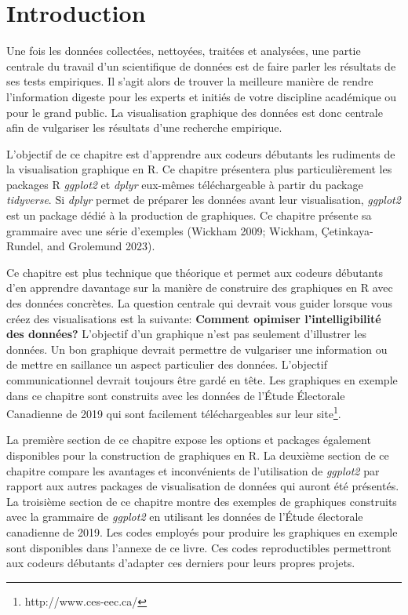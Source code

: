 \documentclass[
  letterpaper,
]{scrbook}
\begin{document}
\hypertarget{introduction-1}{%
\section{Introduction}\label{introduction-1}}

Une fois les données collectées, nettoyées, traitées et analysées, une
partie centrale du travail d'un scientifique de données est de faire
parler les résultats de ses tests empiriques. Il s'agit alors de trouver
la meilleure manière de rendre l'information digeste pour les experts et
initiés de votre discipline académique ou pour le grand public. La
visualisation graphique des données est donc centrale afin de vulgariser
les résultats d'une recherche empirique.

L'objectif de ce chapitre est d'apprendre aux codeurs débutants les
rudiments de la visualisation graphique en R. Ce chapitre présentera
plus particulièrement les packages R \emph{ggplot2} et \emph{dplyr}
eux-mêmes téléchargeable à partir du package \emph{tidyverse}. Si
\emph{dplyr} permet de préparer les données avant leur visualisation,
\emph{ggplot2} est un package dédié à la production de graphiques. Ce
chapitre présente sa grammaire avec une série d'exemples (Wickham 2009;
Wickham, Çetinkaya-Rundel, and Grolemund 2023).

Ce chapitre est plus technique que théorique et permet aux codeurs
débutants d'en apprendre davantage sur la manière de construire des
graphiques en R avec des données concrètes. La question centrale qui
devrait vous guider lorsque vous créez des visualisations est la
suivante: \textbf{Comment opimiser l'intelligibilité des données?}
L'objectif d'un graphique n'est pas seulement d'illustrer les données.
Un bon graphique devrait permettre de vulgariser une information ou de
mettre en saillance un aspect particulier des données. L'objectif
communicationnel devrait toujours être gardé en tête. Les graphiques en
exemple dans ce chapitre sont construits avec les données de l'Étude
Électorale Canadienne de 2019 qui sont facilement téléchargeables sur
leur site\footnote{http://www.ces-eec.ca/}.

La première section de ce chapitre expose les options et packages
également disponibles pour la construction de graphiques en R. La
deuxième section de ce chapitre compare les avantages et inconvénients
de l'utilisation de \emph{ggplot2} par rapport aux autres packages de
visualisation de données qui auront été présentés. La troisième section
de ce chapitre montre des exemples de graphiques construits avec la
grammaire de \emph{ggplot2} en utilisant les données de l'Étude
électorale canadienne de 2019. Les codes employés pour produire les
graphiques en exemple sont disponibles dans l'annexe de ce livre. Ces
codes reproductibles permettront aux codeurs débutants d'adapter ces
derniers pour leurs propres projets.
\end{document}
